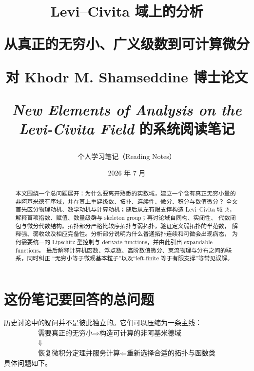 \documentclass[11pt,a4paper]{article}
\title{\bfseries\color{deepblue} Levi--Civita 域上的分析\par
\large 从真正的无穷小、广义级数到可计算微分\par
\vspace{0.4em}\normalsize 对 Khodr M. Shamseddine 博士论文\par
\textit{New Elements of Analysis on the Levi-Civita Field} 的系统阅读笔记}
\author{个人学习笔记（Reading Notes）}
\date{2026 年 7 月}
\theoremstyle{remark}
\newcommand{\LC}{\mathcal R}
\begin{document}
\maketitle

\begin{center}
\end{center}

\begin{abstract}
本文围绕一个总问题展开：为什么要离开熟悉的实数域，建立一个含有真正无穷小量的
非阿基米德有序域，并在其上重建级数、拓扑、连续性、微分、积分与数值微分？
全文首先区分物理动机、数学动机与计算动机；随后从左有限支撑构造 Levi--Civita 域
$\LC$，解释首项指数、赋值、数量级群与 skeleton group；再讨论域自同构、实闭性、
代数闭包与微分代数结构。拓扑部分严格比较序拓扑与弱拓扑，验证定义弱拓扑的半范数，
解释强、弱收敛及相应完备性。分析部分说明为什么普通拓扑连续和可微会出现病态，
为何需要统一的 Lipschitz 型控制与 derivate functions，并由此引出 expandable functions。
最后解释计算机函数、浮点数、高阶数值微分、束流物理与分布之间的联系，同时纠正
“无穷小等于微观基本粒子”以及“left-finite 等于有限支撑”等常见误解。
\end{abstract}

\tableofcontents
\newpage

\section{这份笔记要回答的总问题}

历史讨论中的疑问并不是彼此独立的。它们可以压缩为一条主线：
\[
\begin{gathered}
\boxed{\text{需要真正的无穷小}}
\Longrightarrow
\boxed{\text{构造可计算的非阿基米德域}}\\[0.5em]
\Downarrow\\[-0.1em]
\boxed{\text{恢复微积分定理并服务计算}}
\Longleftarrow
\boxed{\text{重新选择合适的拓扑与函数类}}
\end{gathered}
\]
具体问题如下。
\end{document}
